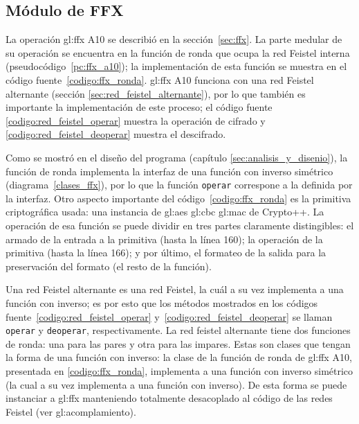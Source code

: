 %
%
%

\subsection{Módulo de FFX}

La operación \gls{gl:ffx} A10 se describió en la sección~\ref{sec:ffx}. La
parte medular de su operación se encuentra en la función de ronda que ocupa
la red Feistel interna (pseudocódigo~\ref{pc:ffx_a10}); la implementación de
esta función se muestra en el código fuente~\ref{codigo:ffx_ronda}.
\gls{gl:ffx} A10 funciona con una red Feistel alternante (sección
\ref{sec:red_feistel_alternante}), por lo que también es importante la
implementación de este proceso; el código fuente
\ref{codigo:red_feistel_operar} muestra la operación de cifrado y
\ref{codigo:red_feistel_deoperar} muestra el descifrado.


Como se mostró en el diseño del programa (capítulo
\ref{sec:analisis_y_disenio}), la función de ronda implementa la
interfaz de una función con inverso simétrico (diagrama~\ref{clases_ffx}), por
lo que la función \texttt{operar} correspone a la definida por la interfaz.
Otro aspecto importante del código~\ref{codigo:ffx_ronda} es la primitiva
criptográfica usada: una instancia de \gls{gl:aes} \gls{gl:cbc} \gls{gl:mac} de
Crypto++. La operación de esa función se puede dividir en tres partes
claramente distingibles: el armado de la entrada a la primitiva (hasta la línea
160); la operación de la primitiva (hasta la línea 166); y por último, el
formateo de la salida para la preservación del formato (el resto de la función).



Una red Feistel alternante es una red Feistel, la cuál a su vez implementa a
una función con inverso; es por esto que los métodos mostrados en los códigos
fuente~\ref{codigo:red_feistel_operar} y~\ref{codigo:red_feistel_deoperar} se
llaman \texttt{operar} y \texttt{deoperar}, respectivamente. La red feistel
alternante tiene dos funciones de  ronda: una para las pares y otra para las
impares. Estas son clases que  tengan la forma de una función con inverso: la
clase de la función de ronda de \gls{gl:ffx} A10, presentada en
\ref{codigo:ffx_ronda}, implementa a una función con inverso simétrico (la cual
a su vez implementa a una función con inverso). De esta forma se puede
instanciar a \gls{gl:ffx} manteniendo totalmente desacoplado al código de las
redes Feistel (ver \gls{gl:acomplamiento}).

